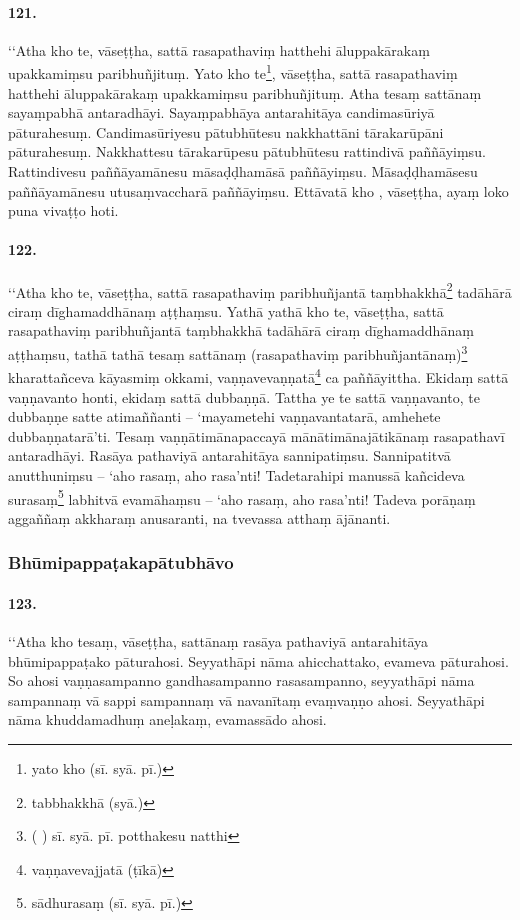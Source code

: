 \paragraph{121.} ‘‘Atha kho te, vāseṭṭha, sattā rasapathaviṃ hatthehi āluppakārakaṃ upakkamiṃsu paribhuñjituṃ. Yato kho te\footnote{yato kho (sī. syā. pī.)}, vāseṭṭha, sattā rasapathaviṃ hatthehi āluppakārakaṃ upakkamiṃsu paribhuñjituṃ. Atha tesaṃ sattānaṃ sayaṃpabhā antaradhāyi. Sayaṃpabhāya antarahitāya candimasūriyā pāturahesuṃ. Candimasūriyesu pātubhūtesu nakkhattāni tārakarūpāni pāturahesuṃ. Nakkhattesu tārakarūpesu pātubhūtesu rattindivā paññāyiṃsu. Rattindivesu paññāyamānesu māsaḍḍhamāsā paññāyiṃsu. Māsaḍḍhamāsesu paññāyamānesu utusaṃvaccharā paññāyiṃsu. Ettāvatā kho , vāseṭṭha, ayaṃ loko puna vivaṭṭo hoti.

\paragraph{122.} ‘‘Atha kho te, vāseṭṭha, sattā rasapathaviṃ paribhuñjantā taṃbhakkhā\footnote{tabbhakkhā (syā.)} tadāhārā ciraṃ dīghamaddhānaṃ aṭṭhaṃsu. Yathā yathā kho te, vāseṭṭha, sattā rasapathaviṃ paribhuñjantā taṃbhakkhā tadāhārā ciraṃ dīghamaddhānaṃ aṭṭhaṃsu, tathā tathā tesaṃ sattānaṃ (rasapathaviṃ paribhuñjantānaṃ)\footnote{( ) sī. syā. pī. potthakesu natthi} kharattañceva kāyasmiṃ okkami, vaṇṇavevaṇṇatā\footnote{vaṇṇavevajjatā (ṭīkā)} ca paññāyittha. Ekidaṃ sattā vaṇṇavanto honti, ekidaṃ sattā dubbaṇṇā. Tattha ye te sattā vaṇṇavanto, te dubbaṇṇe satte atimaññanti – ‘mayametehi vaṇṇavantatarā, amhehete dubbaṇṇatarā’ti. Tesaṃ vaṇṇātimānapaccayā mānātimānajātikānaṃ rasapathavī antaradhāyi. Rasāya pathaviyā antarahitāya sannipatiṃsu. Sannipatitvā anutthuniṃsu – ‘aho rasaṃ, aho rasa’nti! Tadetarahipi manussā kañcideva surasaṃ\footnote{sādhurasaṃ (sī. syā. pī.)} labhitvā evamāhaṃsu – ‘aho rasaṃ, aho rasa’nti! Tadeva porāṇaṃ aggaññaṃ akkharaṃ anusaranti, na tvevassa atthaṃ ājānanti.

\subsubsection{Bhūmipappaṭakapātubhāvo}

\paragraph{123.} ‘‘Atha kho tesaṃ, vāseṭṭha, sattānaṃ rasāya pathaviyā antarahitāya bhūmipappaṭako pāturahosi. Seyyathāpi nāma ahicchattako, evameva pāturahosi. So ahosi vaṇṇasampanno gandhasampanno rasasampanno, seyyathāpi nāma sampannaṃ vā sappi sampannaṃ vā navanītaṃ evaṃvaṇṇo ahosi. Seyyathāpi nāma khuddamadhuṃ aneḷakaṃ, evamassādo ahosi.

